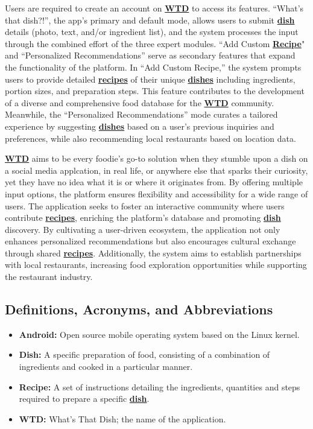 \documentclass[]{article}
\begin{document}
Users are required to create an account on \hyperref[WTD]{\textbf{WTD}} to access its features. “What’s that dish?!”, the app’s primary and default mode, allows users to submit \hyperref[Dish]{\textbf{dish}} details (photo, text, and/or ingredient list), and the system processes the input through the combined effort of the three expert modules. “Add Custom \hyperref[Recipe]{\textbf{Recipe}}" and “Personalized Recommendations” serve as secondary features that expand the functionality of the platform. In “Add Custom Recipe,” the system prompts users to provide detailed \hyperref[Recipe]{\textbf{recipes}} of their unique \hyperref[Dish]{\textbf{dishes}} including ingredients, portion sizes, and preparation steps. This feature contributes to the development of a diverse and comprehensive food database for the \hyperref[WTD]{\textbf{WTD}} community. Meanwhile, the “Personalized Recommendations” mode curates a tailored experience by suggesting \hyperref[Dish]{\textbf{dishes}} based on a user’s previous inquiries and preferences, while also recommending local restaurants based on location data.

\hyperref[WTD]{\textbf{WTD}} aims to be every foodie’s go-to solution when they stumble upon a dish on a social media applcation, in real life, or anywhere else that sparks their curiosity, yet they have no idea what it is or where it originates from. By offering multiple input options, the platform ensures flexibility and accessibility for a wide range of users. The application seeks to foster an interactive community where users contribute \hyperref[Recipe]{\textbf{recipes}}, enriching the platform’s database and promoting \hyperref[Dish]{\textbf{dish}} discovery. By cultivating a user-driven ecosystem, the application not only enhances personalized recommendations but also encourages cultural exchange through shared \hyperref[Recipe]{\textbf{recipes}}. Additionally, the system aims to establish partnerships with local restaurants, increasing food exploration opportunities while supporting the restaurant industry.


\subsection{Definitions, Acronyms, and Abbreviations}
\label{sub:definitions_acronyms_and_abbreviations}

\begin{itemize}
	\item \label{Android}{\textbf{Android:}} Open source mobile operating system based on the Linux kernel.
	\item \label{Dish}{\textbf{Dish:}} A specific preparation of food, consisting of a combination of ingredients and cooked in a particular manner.
	\item \label{Recipe}{\textbf{Recipe:}} A set of instructions detailing the ingredients, quantities and steps required to prepare a specific \hyperref[Dish]{\textbf{dish}}.
	\item \label{WTD}{\textbf{WTD:}} What’s That Dish; the name of the application.
\end{itemize}
\end{document}
